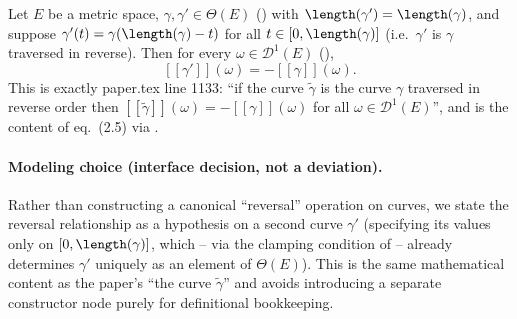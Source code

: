 \begin{lemma}
  Let $E$ be a metric space, $\gamma, \gamma' \in \Theta(E)$ () with
  $\length(\gamma') = \length(\gamma)$, and suppose $\gamma'(t) = \gamma(\length(\gamma)-t)$ for
  all $t \in [0,\length(\gamma)]$ (i.e.\ $\gamma'$ is $\gamma$ traversed in reverse). Then for every
  $\omega \in \mathcal{D}^1(E)$ (),
  \[
    [[\gamma']](\omega) = -[[\gamma]](\omega)
    .
  \]
  This is exactly paper.tex line 1133: ``if the curve $\tilde\gamma$ is the curve $\gamma$
  traversed in reverse order then $[[\tilde\gamma]](\omega)=-[[\gamma]](\omega)$ for all
  $\omega \in \mathcal{D}^1(E)$'', and is the content of eq.~(2.5) via .

  \paragraph{Modeling choice (interface decision, not a deviation).} Rather than constructing a
  canonical ``reversal'' operation on curves, we state the reversal relationship as a hypothesis on
  a second curve $\gamma'$ (specifying its values only on $[0,\length(\gamma)]$, which -- via the
  clamping condition of  -- already determines $\gamma'$ uniquely as an element of
  $\Theta(E)$). This is the same mathematical content as the paper's ``the curve $\tilde\gamma$''
  and avoids introducing a separate constructor node purely for definitional bookkeeping.
\end{lemma}
